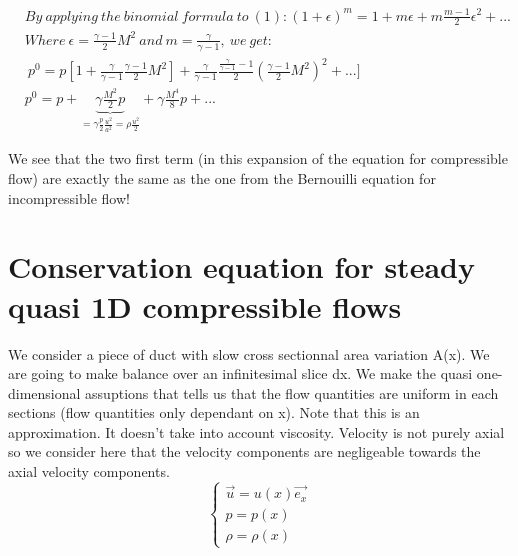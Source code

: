 \begin{equation}
\begin{aligned}
&By\ applying\ the\ binomial\ formula\ to\ (1): (1+\epsilon)^m=1+m\epsilon+m\frac{m-1}{2} \epsilon^2+... \\
&Where\ \epsilon=\frac{\gamma-1}{2}M^2\ and\ m=\frac{\gamma}{\gamma-1},\ we\ get:\\
&\ p^0=p[1+\frac{\gamma}{\gamma-1}\frac{\gamma-1}{2}M^2]+\frac{\gamma}{\gamma-1}\frac{\frac{\gamma}{\gamma-1}-1}{2}(\frac{\gamma-1}{2}M^2)^2+...] \\
& p^0=p+\underbrace{ \gamma \frac{M^2}{2}p}_{=\gamma \frac{p}{2}\frac{u^2}{a^2}=\rho \frac{u^2}{2}}+\gamma \frac{M^4}{8}p+...
\end{aligned}
\end{equation}

We see that the two first term (in this expansion of the equation for compressible flow) are exactly the same as the one from the Bernouilli equation for incompressible flow!

\section{Conservation equation for steady quasi 1D compressible flows}

We consider a piece of duct with slow cross sectionnal area variation A(x). We are going to make balance over an infinitesimal slice dx.  We make the quasi one-dimensional assuptions that tells us that the flow quantities are uniform in each sections (flow quantities only dependant on x). Note that this is an approximation. It doesn't take into account viscosity. Velocity is not purely axial so we consider here that the velocity components are negligeable towards the axial velocity components.
\begin{equation}
\left\{
    \begin{array}{ll}
    \vec{u}=u(x)\vec{e_x} \\
    p=p(x) \\
    \rho=\rho(x)
    \end{array}
\right.
\end{equation}

